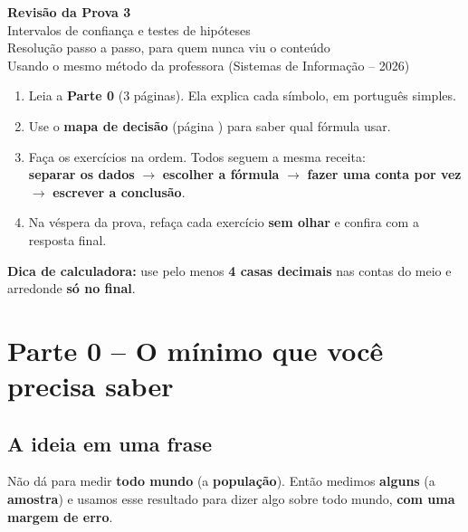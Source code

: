\documentclass[12pt,a4paper]{article}
\begin{document}
\begin{center}
{\Huge\bfseries\color{azul} Revisão da Prova 3}\\[6pt]
{\Large Intervalos de confiança e testes de hipóteses}\\[4pt]
{\large Resolução passo a passo, para quem nunca viu o conteúdo}\\[4pt]
{\normalsize Usando o mesmo método da professora (Sistemas de Informação -- 2026)}
\end{center}

\begin{tcolorbox}[colback=azul!5,colframe=azul,title=Como usar este material]
\begin{enumerate}[leftmargin=*,itemsep=2pt]
  \item Leia a \textbf{Parte 0} (3 páginas). Ela explica cada símbolo, em português simples.
  \item Use o \textbf{mapa de decisão} (página \pageref{mapa}) para saber qual fórmula usar.
  \item Faça os exercícios na ordem. Todos seguem a mesma receita:\\
  \textbf{separar os dados} $\rightarrow$ \textbf{escolher a fórmula} $\rightarrow$ \textbf{fazer uma conta por vez} $\rightarrow$ \textbf{escrever a conclusão}.
  \item Na véspera da prova, refaça cada exercício \textbf{sem olhar} e confira com a resposta final.
\end{enumerate}
\textbf{Dica de calculadora:} use pelo menos \textbf{4 casas decimais} nas contas do meio e arredonde \textbf{só no final}.
\end{tcolorbox}

\tableofcontents

\newpage
\section*{Parte 0 -- O mínimo que você precisa saber}

\subsection*{A ideia em uma frase}
Não dá para medir \textbf{todo mundo} (a \textbf{população}). Então medimos \textbf{alguns} (a \textbf{amostra}) e usamos esse resultado para dizer algo sobre todo mundo, \textbf{com uma margem de erro}.
\end{document}
